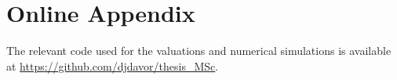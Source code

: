 \section{Online Appendix}

The relevant code used for the valuations and numerical simulations is available at \href{https://github.com/djdavor/thesis_MSc}{https://github.com/djdavor/thesis\_MSc}.